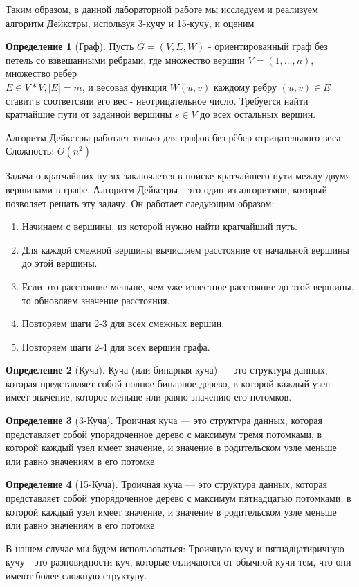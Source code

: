 \documentclass[a4paper, 12pt]{article}
\theoremstyle{definition}
\newtheorem{definition}{Определение}
\begin{document}
	Таким образом, в данной лабораторной работе мы исследуем и реализуем
	алгоритм Дейкстры, используя 3-кучу и 15-кучу, и оценим
	
	\begin{definition}[Граф]
		Пусть $G=(V,E,W)$ - ориентированный граф без петель со взвешанными ребрами, где множество вершин $V = {(1,...,n)}$, множество ребер\\
		$E\in V*V,|E|=m$, и весовая  функция $W (u,v)$ каждому ребру $(u,v)\in E$ ставит в соответсвии его вес - неотрицательное число. Требуется найти кратчайшие пути от заданной вершины $s\in V$ до всех остальных вершин.
	\end{definition}
	Алгоритм Дейкстры работает только для графов без рёбер отрицательного веса.
	Сложность: $O(n^2)$ \newline
	
	Задача о кратчайших путях заключается в поиске кратчайшего пути между двумя вершинами в графе. Алгоритм Дейкстры - это один из алгоритмов, который позволяет решать эту задачу. Он работает следующим образом:
	
	\begin{enumerate}
		\item Начинаем с вершины, из которой нужно найти кратчайший путь.
		\item Для каждой смежной вершины вычисляем расстояние от начальной вершины до этой вершины.
		\item Если это расстояние меньше, чем уже известное расстояние до этой вершины, то обновляем значение расстояния.
		\item Повторяем шаги 2-3 для всех смежных вершин.
		\item Повторяем шаги 2-4 для всех вершин графа.
	\end{enumerate}
	\begin{definition}[Куча]
		Куча (или бинарная куча) --- это структура данных, которая представляет собой полное бинарное дерево, в которой каждый узел имеет значение, которое меньше или равно значению его потомков.
	\end{definition}
	\begin{definition}[3-Куча]
		Троичная куча --- это структура данных, которая представляет собой упорядоченное дерево с максимум тремя потомками, в которой каждый узел имеет значение, и значение в родительском узле меньше или равно значениям в его потомке
	\end{definition}
	\begin{definition}[15-Куча]
		Троичная куча --- это структура данных, которая представляет собой упорядоченное дерево с максимум пятнадцатью потомками, в которой каждый узел имеет значение, и значение в родительском узле меньше или равно значениям в его потомке
	\end{definition}
	В нашем случае мы будем использоваться: Троичную кучу и пятнадцатиричную кучу - это разновидности куч, которые отличаются от обычной кучи тем, что они имеют более сложную структуру. \newline
	
\end{document}
